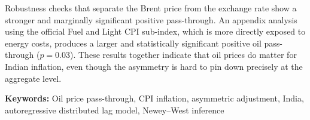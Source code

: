 \documentclass[12pt,a4paper,oneside]{report}
\begin{document}
Robustness checks that separate the Brent price from the exchange rate show a stronger and marginally significant positive pass-through. An appendix analysis using the official Fuel and Light CPI sub-index, which is more directly exposed to energy costs, produces a larger and statistically significant positive oil pass-through ($p = 0.03$). These results together indicate that oil prices do matter for Indian inflation, even though the asymmetry is hard to pin down precisely at the aggregate level.

\textbf{Keywords:} Oil price pass-through, CPI inflation, asymmetric adjustment, India, autoregressive distributed lag model, Newey--West inference

\newpage

\setcounter{page}{1}
\tableofcontents
\newpage
\listoftables
\newpage
\listoffigures
\newpage









\end{document}
